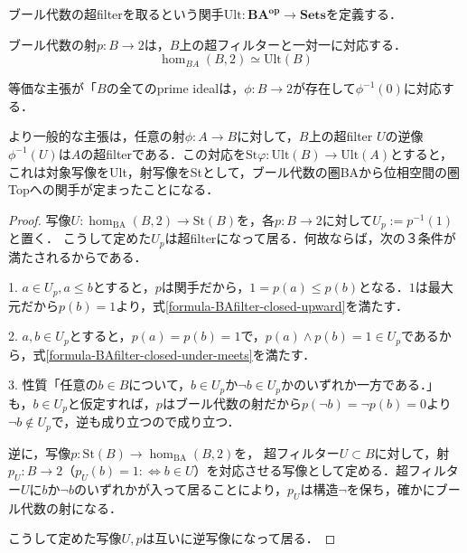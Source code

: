 \documentclass[uplatex, dvipdfmx]{jsarticle}
\begin{document}
\begin{definition*}
    ブール代数の超filterを取るという関手$\mathrm{Ult}:\mathbf{BA^{op}}\to\mathbf{Sets}$を定義する．
\end{definition*}
\begin{proposition*}
    ブール代数の射$p:B\to 2$は，$B$上の超フィルターと一対一に対応する．
    \[ \hom_{BA}(B,2)\simeq \mathrm{Ult}(B) \]
\end{proposition*}
\begin{remark*}
    等価な主張が「$B$の全てのprime idealは，$\phi:B\to 2$が存在して$\phi^{-1}(0)$に対応する．

    より一般的な主張は，任意の射$\phi:A\to B$に対して，$B$上の超filter $U$の逆像$\phi^{-1}(U)$は$A$の超filterである．この対応を$\mathrm{St}\varphi:\mathrm{Ult}(B)\to\mathrm{Ult}(A)$とすると，
    これは対象写像をUlt，射写像をStとして，ブール代数の圏BAから位相空間の圏Topへの関手が定まったことになる．
\end{remark*}
\begin{proof}
    写像$U:\hom_{\mathrm{BA}}(B,2)\to \mathrm{St}(B)$を，各$p:B\to 2$に対して$U_p:=p^{-1}(1)$と置く．
    こうして定めた$U_p$は超filterになって居る．何故ならば，次の３条件が満たされるからである．
    
    1. $a\in U_p,a\le b$とすると，$p$は関手だから，$1=p(a)\le p(b)$となる．$1$は最大元だから$p(b)=1$より，式\ref{formula-BAfilter-closed-upward}を満たす．
    
    2. $a,b\in U_p$とすると，$p(a)=p(b)=1$で，$p(a)\land p(b) = 1\in U_p$であるから，式\ref{formula-BAfilter-closed-under-meets}を満たす．

    3. 性質「任意の$b\in B$について，$b\in U_p$か$\lnot b\in U_p$かのいずれか一方である．」も，$b\in U_p$と仮定すれば，$p$はブール代数の射だから$p(\lnot b)=\lnot p(b)=0$より$\lnot b\notin U_p$で，逆も成り立つので成り立つ．

    逆に，写像$p:\mathrm{St}(B)\to\hom_{\mathrm{BA}}(B,2)$を，
    超フィルター$U\subset B$に対して，射$p_U:B\to 2$（$p_U(b)=1:\Leftrightarrow b\in U$）を対応させる写像として定める．超フィルター$U$に$b$か$\lnot b$のいずれかが入って居ることにより，$p_U$は構造$\lnot$を保ち，確かにブール代数の射になる．

    こうして定めた写像$U,p$は互いに逆写像になって居る．
\end{proof}
\end{document}
